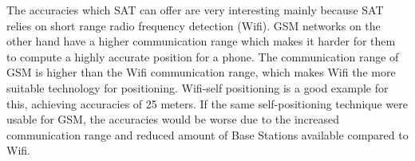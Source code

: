 \documentclass[10pt,titlepage]{article}
\begin{document}
The accuracies which SAT can offer are very interesting mainly because SAT relies on short range radio frequency detection (Wifi). GSM networks on the other hand have a higher communication range which makes it harder for them to compute a highly accurate position for a phone. The communication range of GSM is higher than the Wifi communication range, which makes Wifi the more suitable technology for positioning. Wifi-self positioning is a good example for this, achieving accuracies of 25 meters. If the same self-positioning technique were usable for GSM, the accuracies would be worse due to the increased communication range and reduced amount of Base Stations available compared to Wifi.






%
\newpage


{\footnotesize}
\end{document}
